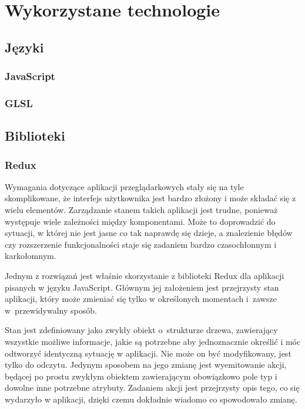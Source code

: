 \documentclass[11pt,a4paper,polish,thesis]{dcsbook}
\begin{document}
	\section{Wykorzystane technologie}
	
	\subsection{Języki}
	
	\subsubsection{JavaScript}
	
	\subsubsection{GLSL}
	
	\subsection{Biblioteki}
	
	\subsubsection{Redux}
	
	Wymagania dotyczące aplikacji przeglądarkowych stały się na tyle skomplikowane, że interfejs użytkownika jest bardzo złożony i może składać się z wielu elementów. Zarządzanie stanem takich aplikacji jest trudne, ponieważ występuje wiele zależności między komponentami. Może to doprowadzić do sytuacji, w której nie jest jasne co tak naprawdę się dzieje, a znalezienie błędów czy rozszerzenie funkcjonalności staje się zadaniem bardzo czasochłonnym i karkołomnym. 
	
	Jednym z rozwiązań jest właśnie skorzystanie z biblioteki Redux dla aplikacji pisanych w języku JavaScript. Głównym jej założeniem jest przejrzysty stan aplikacji, który może zmieniać się tylko w określonych momentach i~zawsze w~przewidywalny sposób. 
	
	Stan jest zdefiniowany jako zwykły obiekt o~strukturze drzewa, zawierający wszystkie możliwe informacje, jakie są potrzebne aby jednoznacznie określić i móc odtworzyć identyczną sytuację w aplikacji. Nie może on być modyfikowany, jest tylko do odczytu. Jedynym sposobem na jego zmianę jest wyemitowanie akcji, będącej po prostu zwykłym obiektem zawierającym obowiązkowo pole typ i dowolne inne potrzebne atrybuty.	Zadaniem akcji jest przejrzysty opis tego, co się wydarzyło w aplikacji, dzięki czemu dokładnie wiadomo co spowodowało zmianę. 
	
\end{document}
